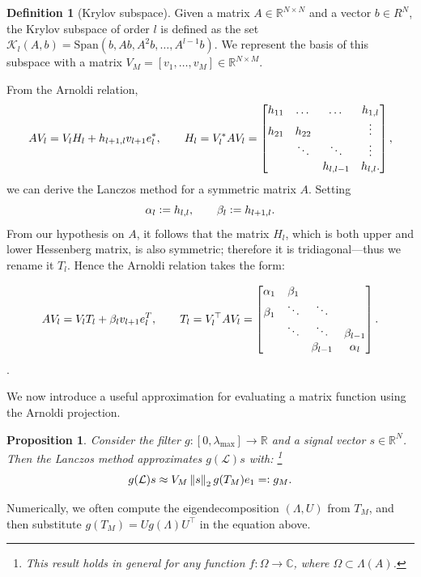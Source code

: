 \documentclass[11pt]{article}
\renewcommand{\mathbb}[1]{\mathds{#1}}
\newcommand{\R}{\mathbb{R}}
\newcommand{\C}{\mathbb{C}}
\renewcommand{\L}{\mathcal{L}}
\newcommand{\defeq}{\vcentcolon=}
\newcommand{\eqdef}{=\vcentcolon}
\newcommand{\norm}[1]{\left\lVert#1\right\rVert}
\newtheorem{proposition}[theorem]{Proposition}
\theoremstyle{definition}
\newtheorem{definition}[theorem]{Definition}
\theoremstyle{remark}
\theoremstyle{experimental}
\begin{document}
\begin{definition}[Krylov subspace]
 Given a matrix $ A \in \R^{N \times N} $ and a vector $ b \in R^N $, the Krylov subspace of order
 $l$ is defined as the set $ \mathcal{K}_l (A,b) = \text{Span} \left(b, Ab, A^2b, \dots,
A^{l-1}b\right)  $. We represent the basis of this subspace with a matrix $ V_M = \left[ v_1,\dots,v_M
\right] \in \R^{N \times M}$.
\end{definition}
From the Arnoldi relation,
\begin{equation*}
  AV_l = V_lH_l + h_{l+1,l}v_{l+1}e_l^{*}, \\ \hspace{20pt}
  H_l = V_l^{*}AV_l =
  \begin{bmatrix}
    h_{11} & \dots & \dots & h_{1,l} \\
    h_{21} & h_{22} & & \vdots \\
           & \ddots & \ddots & \vdots \\
           & & h_{l,l-1} & h_{l,l}.
  \end{bmatrix},
\end{equation*}
we can derive the Lanczos method for a symmetric matrix $ A $. Setting
\begin{equation*}
\alpha_l \defeq h_{l,l},\hspace{20pt}\beta_l \defeq h_{l+1,l}.
\end{equation*}
From our hypothesis on $ A $, it follows that the matrix $ H_l $, which is both upper and lower Hessenberg 
matrix, is also symmetric; therefore it is tridiagonal---thus we rename it $ T_l $. Hence
the Arnoldi relation takes the form:

\begin{equation*}
  AV_l = V_l T_l  + \beta_l v_{l+1}e_l^{T}, \\ \hspace{20pt}
  T_l = V_l^{\top} A V_l = \begin{bmatrix}
    \alpha_1 & \beta_1 \\
    \beta_1 & \ddots & \ddots \\
      & \ddots & \ddots & \beta_{l-1} \\
      & & \beta_{l-1} & \alpha_l
  \end{bmatrix}.
\end{equation*}.

We now introduce a useful approximation for evaluating a matrix function using the Arnoldi projection.
\begin{proposition}
 Consider the filter $ g : [0, \lambda_{\text{max}}] \to \R$ and a signal vector $ s \in \R^N $.
 Then the Lanczos method approximates $ g(\L)s $ with: \footnote{This result holds in general for any function $f :\Omega \to \C$, where $ \Omega \subset \Lambda(A) $.}
\begin{equation}
 g(\L)s \approx  V_M \norm{s}_2 g(T_M) e_1 \eqdef g_M. \label{eq:projection}
\end{equation}
\end{proposition}
Numerically, we often compute the eigendecomposition $ (\Lambda,U) $ from $ T_M $, and then
substitute $ g(T_M) = Ug(\Lambda)U^{\top} $ in the equation above.
\end{document}
